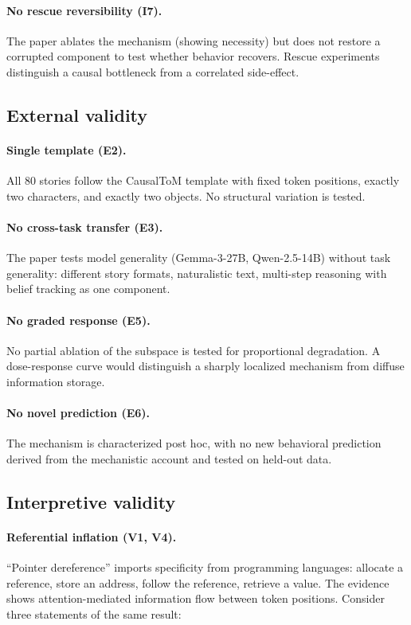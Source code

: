 \documentclass{article}
\begin{document}
\paragraph{No rescue reversibility (I7).}
The paper ablates the mechanism (showing necessity) but does not restore a corrupted component to test whether behavior recovers. Rescue experiments distinguish a causal bottleneck from a correlated side-effect.

\subsection{External validity}

\paragraph{Single template (E2).}
All 80 stories follow the CausalToM template with fixed token positions, exactly two characters, and exactly two objects. No structural variation is tested.

\paragraph{No cross-task transfer (E3).}
The paper tests model generality (Gemma-3-27B, Qwen-2.5-14B) without task generality: different story formats, naturalistic text, multi-step reasoning with belief tracking as one component.

\paragraph{No graded response (E5).}
No partial ablation of the subspace is tested for proportional degradation. A dose-response curve would distinguish a sharply localized mechanism from diffuse information storage.

\paragraph{No novel prediction (E6).}
The mechanism is characterized post hoc, with no new behavioral prediction derived from the mechanistic account and tested on held-out data.

\subsection{Interpretive validity}

\paragraph{Referential inflation (V1, V4).}
``Pointer dereference'' imports specificity from programming languages: allocate a reference, store an address, follow the reference, retrieve a value. The evidence shows attention-mediated information flow between token positions. Consider three statements of the same result:
\end{document}
